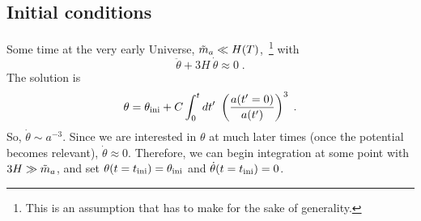 \documentclass[10pt,utf8,compress,xcolor=dvipsnames]{beamer}
\begin{document}
\subsection{Initial conditions}
\begin{frame}{\insertsubsectionhead}
	Some time at the very early Universe, $\tilde m_{a}{} \ll H(T)$,~\footnote{\fontF This is an assumption that \mimes has to make for the sake of generality.} with
	\begin{equation*}
		\ddot{\theta}  + 3H \ \dot{\theta} \approx 0 \;.
	\end{equation*}	
	The solution is 
	$$
	\theta = \theta_{\rm ini}{} + C \displaystyle \int_{0}^t d t' \ \left(  \dfrac{a(t'=0)}{a(t')}  \right)^3 \;.
	$$
	So, $\dot{\theta} \sim a^{-3}$. Since we are interested in $\theta$ at much later times (once the potential becomes relevant), $\dot{\theta} \approx 0$.%
%		
	Therefore, we can begin integration at some point with $3H \gg \tilde m_{a}{}$, and set $\theta(t=t_{\rm ini}{}) = \theta_{\rm ini}{}$ and $\dot \theta(t=t_{\rm ini}{}) = 0$. 
	
\end{frame}
\end{document}
